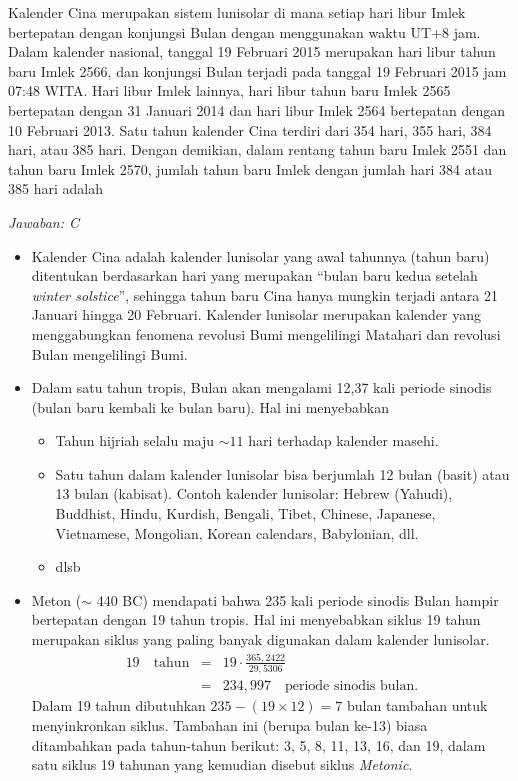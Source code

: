 \documentclass[11pt,fleqn, a4paper]{exam}
\begin{document}
\begin{questions}
\vspace{0.5cm}
\question Kalender Cina merupakan sistem lunisolar di mana setiap hari libur Imlek bertepatan dengan konjungsi Bulan dengan menggunakan waktu UT+8 jam. Dalam kalender nasional, tanggal 19 Februari 2015 merupakan hari libur tahun baru Imlek 2566, dan konjungsi Bulan terjadi pada tanggal 19 Februari 2015 jam 07:48 WITA. Hari libur Imlek lainnya, hari libur tahun baru Imlek 2565 bertepatan dengan 31 Januari 2014 dan hari libur Imlek 2564 bertepatan dengan 10 Februari 2013. Satu tahun kalender Cina terdiri dari 354 hari, 355 hari, 384 hari, atau 385 hari. Dengan demikian, dalam rentang tahun baru Imlek 2551 dan tahun baru Imlek 2570, jumlah tahun baru Imlek dengan jumlah hari 384 atau 385 hari adalah
\begin{choices}
\end{choices}

\textit{Jawaban: C}
\begin{itemize}
\item Kalender Cina adalah kalender lunisolar yang awal tahunnya (tahun baru) ditentukan berdasarkan hari yang merupakan ``bulan baru kedua setelah \textit{winter solstice}'', sehingga tahun baru Cina hanya mungkin terjadi antara 21 Januari hingga 20 Februari. Kalender lunisolar merupakan kalender yang menggabungkan fenomena revolusi Bumi mengelilingi Matahari dan revolusi Bulan mengelilingi Bumi. 

\item Dalam satu tahun tropis, Bulan akan mengalami 12,37 kali periode sinodis (bulan baru kembali ke bulan baru). Hal ini menyebabkan
\begin{itemize}
\item Tahun hijriah selalu maju $\sim 11$ hari terhadap kalender masehi.
\item Satu tahun dalam kalender lunisolar bisa berjumlah 12 bulan (basit) atau 13 bulan (kabisat). Contoh kalender lunisolar: Hebrew (Yahudi), Buddhist, Hindu, Kurdish, Bengali, Tibet, Chinese, Japanese, Vietnamese, Mongolian, Korean calendars, Babylonian, dll.
\item dlsb
\end{itemize}

\item Meton ($\sim$ 440 BC) mendapati bahwa 235 kali periode sinodis Bulan hampir bertepatan dengan 19 tahun tropis. Hal ini menyebabkan siklus 19 tahun merupakan siklus yang paling banyak digunakan dalam kalender lunisolar.
\begin{eqnarray*}
19 \quad \text{tahun} &=& 19 \cdot \frac{365,2422}{29,5306}\\
&=& 234,997 \quad \text{periode sinodis bulan.}
\end{eqnarray*}
Dalam 19 tahun dibutuhkan $235 - (19 \times 12) = 7$ bulan tambahan untuk menyinkronkan siklus. Tambahan ini (berupa bulan ke-13) biasa ditambahkan pada tahun-tahun berikut: 3, 5, 8, 11, 13, 16, dan 19, dalam satu siklus 19 tahunan yang kemudian disebut siklus \textit{Metonic}.


\end{itemize}
\end{questions}
\end{document}
